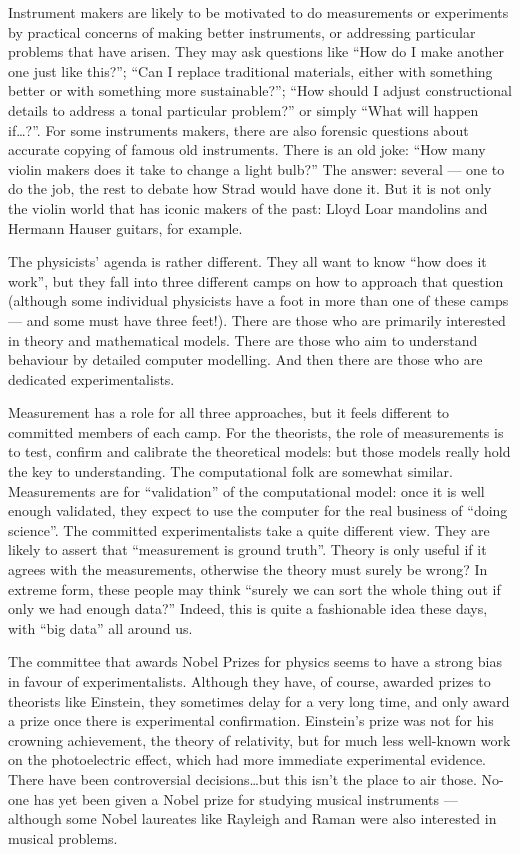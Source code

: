   Instrument makers are likely to be motivated to do measurements or 
  experiments by practical concerns of making better instruments, or addressing 
  particular problems that have arisen. They may ask questions like “How do I 
  make another one just like this?”; “Can I replace traditional materials, 
  either with something better or with something more sustainable?”; “How 
  should I adjust constructional details to address a tonal particular 
  problem?” or simply “What will happen if…?”. For some instruments makers, 
  there are also forensic questions about accurate copying of famous old 
  instruments. There is an old joke: “How many violin makers does it take to 
  change a light bulb?” The answer: several — one to do the job, the rest to 
  debate how Strad would have done it. But it is not only the violin world that 
  has iconic makers of the past: Lloyd Loar mandolins and Hermann Hauser 
  guitars, for example. 

  The physicists’ agenda is rather different. They all want to know “how does 
  it work”, but they fall into three different camps on how to approach that 
  question (although some individual physicists have a foot in more than one of 
  these camps — and some must have three feet!). There are those who are 
  primarily interested in theory and mathematical models. There are those who 
  aim to understand behaviour by detailed computer modelling. And then there 
  are those who are dedicated experimentalists. 

  Measurement has a role for all three approaches, but it feels different to 
  committed members of each camp. For the theorists, the role of measurements 
  is to test, confirm and calibrate the theoretical models: but those models 
  really hold the key to understanding. The computational folk are somewhat 
  similar. Measurements are for “validation” of the computational model: once 
  it is well enough validated, they expect to use the computer for the real 
  business of “doing science”. The committed experimentalists take a quite 
  different view. They are likely to assert that “measurement is ground truth”. 
  Theory is only useful if it agrees with the measurements, otherwise the 
  theory must surely be wrong? In extreme form, these people may think “surely 
  we can sort the whole thing out if only we had enough data?” Indeed, this is 
  quite a fashionable idea these days, with “big data” all around us. 

  The committee that awards Nobel Prizes for physics seems to have a strong 
  bias in favour of experimentalists. Although they have, of course, awarded 
  prizes to theorists like Einstein, they sometimes delay for a very long time, 
  and only award a prize once there is experimental confirmation. Einstein’s 
  prize was not for his crowning achievement, the theory of relativity, but for 
  much less well-known work on the photoelectric effect, which had more 
  immediate experimental evidence. There have been controversial decisions…but 
  this isn’t the place to air those. No-one has yet been given a Nobel prize 
  for studying musical instruments --- although some Nobel laureates like 
  Rayleigh and Raman were also interested in musical problems. 


